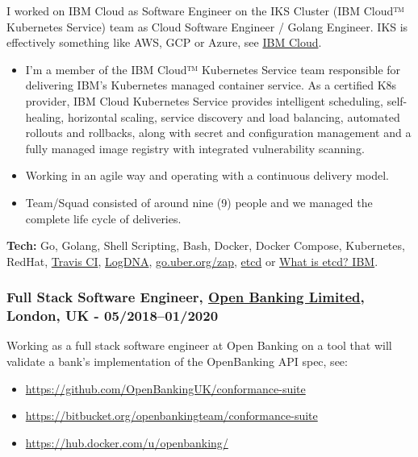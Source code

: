 \documentclass[
  a4paper,
]{article}
\providecommand{\tightlist}{%
  \setlength{\itemsep}{0pt}\setlength{\parskip}{0pt}}
\begin{document}
I worked on IBM Cloud as Software Engineer on the IKS Cluster (IBM
Cloud™ Kubernetes Service) team as Cloud Software Engineer / Golang
Engineer. IKS is effectively something like AWS, GCP or Azure, see
\href{https://cloud.ibm.com/}{IBM Cloud}.

\begin{itemize}
\tightlist
\item
  I'm a member of the IBM Cloud™ Kubernetes Service team responsible for
  delivering IBM's Kubernetes managed container service. As a certified
  K8s provider, IBM Cloud Kubernetes Service provides intelligent
  scheduling, self-healing, horizontal scaling, service discovery and
  load balancing, automated rollouts and rollbacks, along with secret
  and configuration management and a fully managed image registry with
  integrated vulnerability scanning.
\item
  Working in an agile way and operating with a continuous delivery
  model.
\item
  Team/Squad consisted of around nine (9) people and we managed the
  complete life cycle of deliveries.
\end{itemize}

\textbf{Tech:} Go, Golang, Shell Scripting, Bash, Docker, Docker
Compose, Kubernetes, RedHat, \href{https://travis-ci.org/}{Travis CI},
\href{https://logdna.com/}{LogDNA},
\href{https://github.com/uber-go/zap}{go.uber.org/zap},
\href{https://etcd.io/}{etcd} or
\href{https://www.ibm.com/cloud/learn/etcd}{What is etcd? \textbar{}
IBM}.

\hypertarget{full-stack-software-engineer-open-banking-limited-london-uk---052018012020}{%
\subsubsection{\texorpdfstring{Full Stack Software Engineer,
\href{https://www.openbanking.org.uk}{Open Banking Limited}, London, UK
-
05/2018--01/2020}{Full Stack Software Engineer, Open Banking Limited, London, UK - 05/2018--01/2020}}\label{full-stack-software-engineer-open-banking-limited-london-uk---052018012020}}

Working as a full stack software engineer at Open Banking on a tool that
will validate a bank's implementation of the OpenBanking API spec, see:

\begin{itemize}
\tightlist
\item
  \url{https://github.com/OpenBankingUK/conformance-suite}
\item
  \url{https://bitbucket.org/openbankingteam/conformance-suite}
\item
  \url{https://hub.docker.com/u/openbanking/}
\end{itemize}
\end{document}
